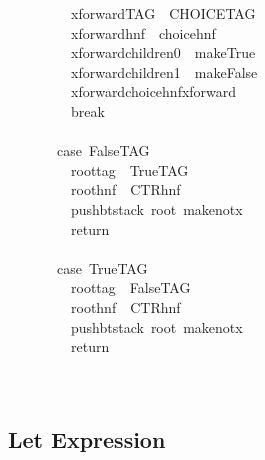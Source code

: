 \documentclass{book}
\theoremstyle{definition}
\begin{document}
{\begin{tabbing}
\ttfamily ~~~~~~~~~xforwardTAG~~CHOICETAG\\
\ttfamily ~~~~~~~~~xforwardhnf~~choicehnf\\
\ttfamily ~~~~~~~~~xforwardchildren0~~makeTrue\\
\ttfamily ~~~~~~~~~xforwardchildren1~~makeFalse\\
\ttfamily ~~~~~~~~~xforwardchoicehnfxforward\\
\ttfamily ~~~~~~~~~break\\
\ttfamily ~\\
\ttfamily ~~~~~~~case~FalseTAG\\
\ttfamily ~~~~~~~~~roottag~~TrueTAG\\
\ttfamily ~~~~~~~~~roothnf~~CTRhnf\\
\ttfamily ~~~~~~~~~pushbtstack~root~makenotx\\
\ttfamily ~~~~~~~~~return\\
\ttfamily ~\\
\ttfamily ~~~~~~~case~TrueTAG\\
\ttfamily ~~~~~~~~~roottag~~FalseTAG\\
\ttfamily ~~~~~~~~~roothnf~~CTRhnf\\
\ttfamily ~~~~~~~~~pushbtstack~root~makenotx\\
\ttfamily ~~~~~~~~~return\\
\ttfamily ~~~~~\\
\ttfamily ~
\end{tabbing}


\subsection{Let Expression}

}
\end{document}
